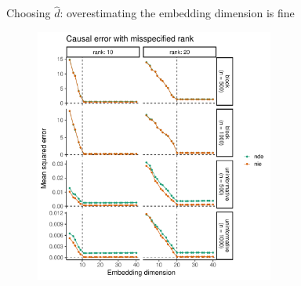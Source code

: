 \documentclass{beamer}
\theoremstyle{remark}
\begin{document}
\begin{frame}{Choosing $\widehat{d}$: overestimating the embedding dimension is fine}

    \centering

    \begin{figure}
        \includegraphics[width=0.7\textwidth]{figures/misspecification/loss_average.pdf}
    \end{figure}

\end{frame}
\end{document}
